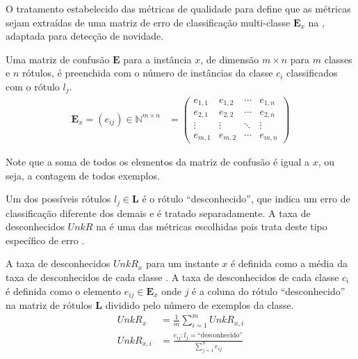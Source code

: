 O tratamento estabelecido das métricas de qualidade para \streamMining define
que as métricas sejam extraídas de uma matriz de erro de classificação
multi-classe $\mathbf{E}_x$ na , adaptada para detecção de
novidade.

\begin{definition}
  Uma matriz de confusão $\mathbf{E}$ para a instância $x$, de dimensão $m \times
  n$ para $m$ classes e $n$ rótulos, é preenchida com o número de instâncias da
  classe $c_i$ classificados com o rótulo $l_j$.
  \begin{align}
    \mathbf{E}_x = (e_{ij})\in \mathbb{N} ^{m\times n}
    &= \begin{pmatrix}
      e_{1,1} & e_{1,2} & \cdots & e_{1,n} \\
      e_{2,1} & e_{2,2} & \cdots & e_{2,n} \\
      \vdots  & \vdots  & \ddots & \vdots  \\
      e_{m,1} & e_{m,2} & \cdots & e_{m,n} 
    \end{pmatrix}  \label{eq:matrix}
  \end{align}
\end{definition}

Note que a soma de todos os elementos da matriz de confusão é igual a $x$, ou
seja, a contagem de todos exemplos.

Um dos possíveis rótulos $l_j \in \mathbf{L}$ é o rótulo ``desconhecido'', que
indica um erro de classificação diferente dos demais e é tratado separadamente.
A taxa de desconhecidos $\mathit{UnkR}$ na  é uma das métricas escolhidas
pois trata deste tipo específico de erro \cite{Faria2013evaluation}.

\begin{definition}
  A taxa de desconhecidos $\mathit{UnkR}_x$ para um instante $x$ é definida como
  a média da taxa de desconhecidos de cada classe \cite{Faria2013evaluation}.
  A taxa de desconhecidos de cada classe $c_i$ é definida como o elemento
  $e_{ij} \in \mathbf{E}_x$ onde $j$ é a coluna do rótulo ``desconhecido''
  na matriz de rótulos $\mathbf{L}$ dividido pelo número de exemplos da classe.
  \begin{align}
    \mathit{UnkR}_x & = \frac{1}{m} \sum_{i=1}^{m} \mathit{UnkR}_{x, i} \\
    \mathit{UnkR}_{x, i}
      &= \frac{e_{i j} : l_j = \text{``desconhecido''}}{\sum_{j=1}^{n} e_{i j}}
      \label{eq:unkr}
  \end{align}
\end{definition}

